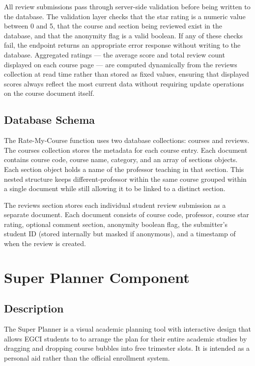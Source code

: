 All review submissions pass through server-side validation before being written to the database. The validation layer checks that the star rating is a numeric value between 0 and 5, that the course and section being reviewed exist in the database, and that the anonymity flag is a valid boolean. If any of these checks fail, the endpoint returns an appropriate error response without writing to the database. Aggregated ratings — the average score and total review count displayed on each course page — are computed dynamically from the reviews collection at read time rather than stored as fixed values, ensuring that displayed scores always reflect the most current data without requiring update operations on the course document itself. 

\subsection{Database Schema}
The Rate-My-Course function uses two database collections: courses and reviews.
The courses collection stores the metadata for each course entry. Each document contains course code, course name, category, and an array of sections objects. Each section object holds a name of the professor teaching in that section. This nested structure keeps different-professor  within the same course grouped within a single document while still allowing it to be linked to a distinct section.

The reviews section stores each individual student review submission as a separate document. Each document consists of course code, professor, course star rating, optional comment section, anonymity boolean flag, the submitter’s student ID (stored internally but masked if anonymous), and a timestamp of when the review is created.

\section{Super Planner Component}
\subsection{Description}
The Super Planner is a visual academic planning tool with interactive design that allows EGCI students to to arrange the plan for their entire academic studies by dragging and dropping course bubbles into free trimester slots. It is intended as a personal aid rather than the official enrollment system.

